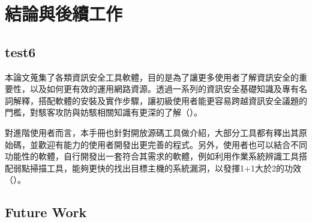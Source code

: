 \chapter{結論與後續工作}
\label{cha:work} 

\section{test6}
\label{sec:test6}


本論文蒐集了各類資訊安全工具軟體，目的是為了讓更多使用者了解資訊安全的重要性，以及如何更有效的運用網路資源。透過一系列的資訊安全基礎知識及專有名詞解釋，搭配軟體的安裝及實作步驟，讓初級使用者能更容易跨越資訊安全議題的門檻，對駭客攻防與妨駭相關知識有更深的了解（\cite{Guo2021}）。

對進階使用者而言，本手冊也針對開放源碼工具做介紹，大部分工具都有釋出其原始碼，並歡迎有能力的使用者開發出更完善的程式。另外，使用者也可以結合不同功能性的軟體，自行開發出一套符合其需求的軟體，例如利用作業系統辨識工具搭配弱點掃描工具，能夠更快的找出目標主機的系統漏洞，以發揮1+1大於2的功效（\cite{test1}）。

\section{Future Work} 
\label{sec:work1}